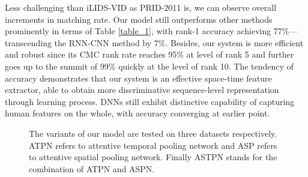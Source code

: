 \documentclass[10pt,twocolumn,letterpaper]{article}
\begin{document}
Less challenging than iLIDS-VID as PRID-2011 is, we can observe overall increments in matching rate. Our model still outperforms other methods prominently in terms of Table \ref{table_1}, with rank-1 accuracy achieving 77\%---transcending  the RNN-CNN method by 7\%. Besides, our system is more efficient and robust since its CMC rank rate reaches 95\% at level of rank 5 and  further goes up to the summit of 99\% quickly at the level of rank 10. The tendency of accuracy demonstrates that our system is an effective space-time feature extractor, able to obtain more discriminative sequence-level representation through learning process. DNNs \cite{C_RNN,RFA} still exhibit distinctive capability of capturing human features on the whole, with accuracy converging at earlier point.
 

\begin{figure}[!htb]
\centering
{}
\caption{The variants of our model are tested on three datasets respectively. ATPN refers to attentive temporal pooling network and ASP refers to attentive spatial pooling network. Finally ASTPN stands for the combination of ATPN and ASPN.}
\label{fig:Comparison}
\vspace{-.8em}
\end{figure}
 
\end{document}
